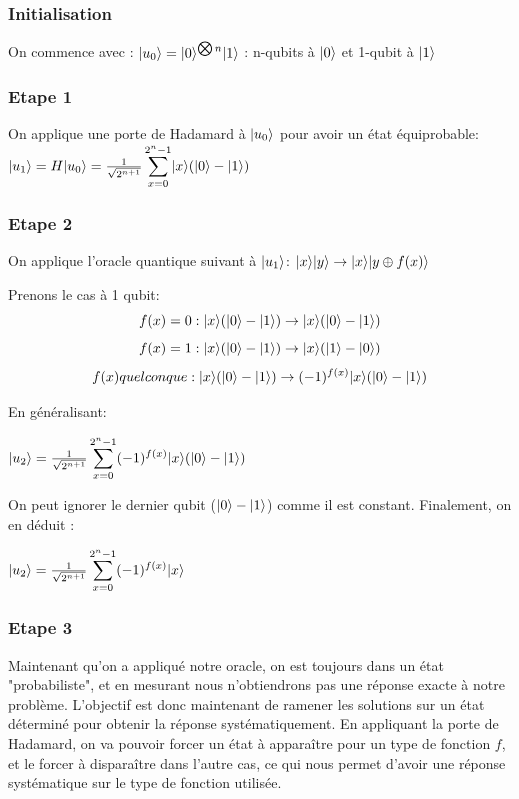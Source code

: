 \documentclass[12pt,a4paper]{article}
\DeclarePairedDelimiter\ket{\lvert}{\rangle}
\begin{document}
\subsubsection{Initialisation}
On commence avec :
$\ket{u_0} = \ket{0}^{\bigotimes n}\ket{1}$
: n-qubits à $\ket{0}$ et 1-qubit à $\ket{1}$

\subsubsection{Etape 1}

On applique une porte de Hadamard à $\ket{u_0}$ pour avoir un état équiprobable:
$\ket{u_1} = H\ket{u_0} = \frac{1}{\sqrt{2^{n + 1}}}
\displaystyle\sum_{x=0}^{2^n-1} \ket{x}(\ket{0} - \ket{1})$

\subsubsection{Etape 2}
On applique l'oracle quantique suivant à $\ket{u_1}$: $\ket{x}\ket{y}\rightarrow\ket{x}\ket{y\oplus f(x)}$

Prenons le cas à 1 qubit:
\[
f(x) = 0: \ket{x}(\ket{0} - \ket{1}) \rightarrow \ket{x}(\ket{0} - \ket{1})
\]
\[
f(x) = 1: \ket{x}(\ket{0} - \ket{1}) \rightarrow \ket{x}(\ket{1} - \ket{0})
\]
\[
f(x) quelconque: \ket{x}(\ket{0} - \ket{1}) \rightarrow (-1)^{f(x)}\ket{x}(\ket{0} - \ket{1})
\]

En généralisant:

$\ket{u_2} = \frac{1}{\sqrt{2^{n + 1}}}
\displaystyle\sum_{x=0}^{2^n-1} (-1)^{f(x)}\ket{x}(\ket{0} - \ket{1})$

On peut ignorer le dernier qubit ($\ket{0} - \ket{1}$) comme il est
constant. Finalement, on en déduit :

$\ket{u_2} = \frac{1}{\sqrt{2^{n + 1}}}
\displaystyle\sum_{x=0}^{2^n-1} (-1)^{f(x)}\ket{x}$

\subsubsection{Etape 3}

Maintenant qu'on a appliqué notre oracle, on est toujours dans un état "probabiliste", et en mesurant nous n'obtiendrons pas une réponse exacte à notre problème. L'objectif est donc maintenant de ramener les solutions sur un état déterminé pour obtenir la réponse systématiquement. En appliquant la porte de Hadamard, on va pouvoir forcer un état à apparaître pour un type de fonction $f$, et le forcer à disparaître dans l'autre cas, ce qui nous permet d'avoir une réponse systématique sur le type de fonction utilisée.
\end{document}
